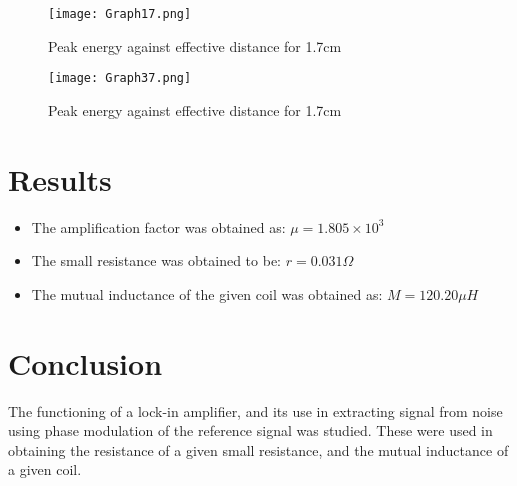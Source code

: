 \documentclass[a4paper]{article}
\begin{document}
\begin{center}
\begin{figure}[H]
	\begin{center}
  \texttt{[image: Graph17.png]}
  \caption{Peak energy against effective distance for 1.7cm}
  \end{center}
\end{figure}
\end{center}

\begin{center}
\begin{figure}[H]
	\begin{center}
  \texttt{[image: Graph37.png]}
  \caption{Peak energy against effective distance for 1.7cm}
  \end{center}
\end{figure}
\end{center}


\section*{Results}

\begin{itemize}
	\item The amplification factor was obtained as: $\mu = 1.805 \times 10^3$
	\item The small resistance was obtained to be: $r =0.031\Omega$
	\item The mutual inductance of the given coil was obtained as: $M = 120.20 \mu H$
\end{itemize}

\section*{Conclusion}

The functioning of a lock-in amplifier, and its use in extracting signal from noise using phase modulation of the reference signal was studied. These were used in obtaining the resistance of a given small resistance, and the mutual inductance of a given coil.
\end{document}
